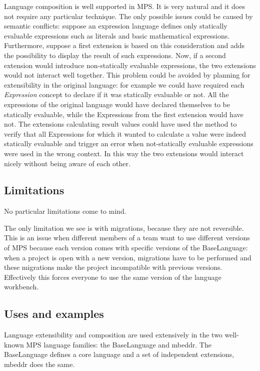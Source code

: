 \documentclass[preprint,numbers,10pt]{sigplanconf}
\begin{document}
Language composition is well supported in MPS. It is very natural and it does not require any particular technique. The only possible issues could be caused by semantic conflicts: suppose an expression language defines only statically evaluable expressions such as literals and basic mathematical expressions. Furthermore, suppose a first extension is based on this consideration and adds the possibility to display the result of such expressions. Now, if a second extension would introduce non-statically evaluable expressions, the two extensions would not interact well together. This problem could be avoided by planning for extensibility in the original language: for example we could have required each \emph{Expression} concept to declare if it was statically evaluable or not. All the expressions of the original language would have declared themselves to be statically evaluable, while the Expressions from the first extension would have not. The extensions calculating result values could have used the method to verify that all Expressions for which it wanted to calculate a value were indeed statically evaluable and trigger an error when not-statically evaluable expressions were used in the wrong context. In this way the two extensions would interact nicely without being aware of each other.

\subsection{Limitations}

No particular limitations come to mind.

The only limitation we see is with migrations, because they are not reversible. This is an issue when different members of a team want to use different versions of MPS because each version comes with specific versions of the BaseLanguage: when a project is open with a new version, migrations have to be performed and these migrations make the project incompatible with previous versions. Effectively this forces everyone to use the same version of the language workbench.

\subsection{Uses and examples}

Language extensibility and composition are used extensively in the two well-known MPS language families: the BaseLanguage and mbeddr. The BaseLanguage defines a core language and a set of independent extensions, mbeddr does the same.
\end{document}
